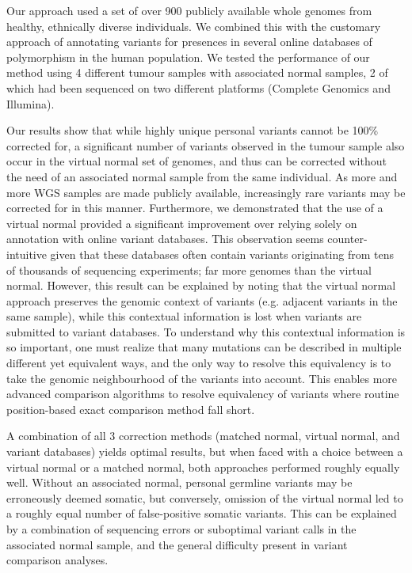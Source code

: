 Our approach used a set of over 900 publicly available whole genomes from healthy, ethnically diverse individuals. We combined this with the customary approach of annotating variants for presences in several online databases of polymorphism in the human population. We tested the performance of our method using 4 different tumour samples with associated normal samples, 2 of which had been sequenced on two different platforms (Complete Genomics and Illumina).

Our results show that while highly unique personal variants cannot be 100\% corrected for, a significant number of variants observed in the tumour sample also occur in the virtual normal set of genomes, and thus can be corrected without the need of an associated normal sample from the same individual. As more and more WGS samples are made publicly available, increasingly rare variants may be corrected for in this manner. Furthermore, we demonstrated that the use of a virtual normal provided a significant improvement over relying solely on annotation with online variant databases. This observation seems counter-intuitive given that these databases often contain variants originating from tens of thousands of sequencing experiments; far more genomes than the virtual normal. However, this result can be explained by noting that the virtual normal approach preserves the genomic context of variants (e.g. adjacent variants in the same sample), while this contextual information is lost when variants are submitted to variant databases. To understand why this contextual information is so important, one must realize that many mutations can be described in multiple different yet equivalent ways, and the only way to resolve this equivalency is to take the genomic neighbourhood of the variants into account. This enables more advanced comparison algorithms to resolve equivalency of variants where routine position-based exact comparison method fall short.

A combination of all 3 correction methods (matched normal, virtual normal, and variant databases) yields optimal results, but when faced with a choice between a virtual normal or a matched normal, both approaches performed roughly equally well. Without an associated normal, personal germline variants may be erroneously deemed somatic, but conversely, omission of the virtual normal led to a roughly equal number of false-positive somatic variants. This can be explained by a combination of sequencing errors or suboptimal variant calls in the associated normal sample, and the general difficulty present in variant comparison analyses.

